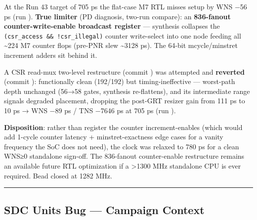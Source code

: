 \begin{record}

At the Run 43 target of 705 ps the flat-case M7 RTL misses setup by WNS
−56 ps (run ). \textbf{True limiter} (PD
diagnosis, two-run compare): an \textbf{836-fanout counter-write-enable
broadcast register} --- synthesis collapses the
\texttt{(csr\_\allowbreak{}access\ \&\&\ !csr\_\allowbreak{}illegal)}
counter write-select into one node feeding all \textasciitilde224 M7
counter flops (pre-PNR slew \textasciitilde3128 ps). The 64-bit
mcycle/\allowbreak{}minstret increment adders sit behind it.

A CSR read-mux two-level restructure (commit ) was
attempted and \textbf{reverted} (commit ): functionally
clean (192/192) but timing-ineffective --- worst-path depth unchanged
(56→58 gates, synthesis re-flattens), and its intermediate range signals
degraded placement, dropping the post-GRT resizer gain from 111 ps to 10
ps → WNS −89 ps / TNS −7646 ps at 705 ps (run
).

\textbf{Disposition}: rather than register the counter increment-enables
(which would add 1-cycle counter latency + minstret-exactness edge cases
for a vanity frequency the SoC does not need), the clock was relaxed to
780 ps for a clean WNS≥0 standalone sign-off. The 836-fanout
counter-enable restructure remains an available future RTL optimization
if a \textgreater1300 MHz standalone CPU is ever required. Bead
 closed at 1282 MHz.

\begin{center}\rule{0.5\linewidth}{0.5pt}\end{center}

\end{record}

\subsection{\texorpdfstring{\warn{} SDC Units Bug --- Campaign
Context}{ SDC Units Bug --- Campaign Context}}\label{cr:run:asap7:warning-sdc-units-bug-campaign-context}

